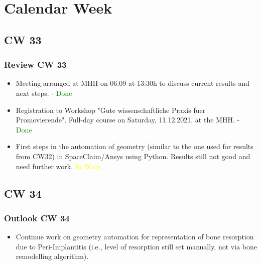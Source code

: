 \section{Calendar Week}
\subsection{CW 33}
\begin{frame}
  \frametitle{Review CW 33}
	\begin{itemize}
		\item Meeting arranged at MHH on 06.09 at 13:30h to discuss current results and next steps. - \textcolor{green}{Done}
		\item Registration to Workshop "Gute wissenschaftliche Praxis fuer Promovierende". Full-day course on Saturday, 11.12.2021, at the MHH. - \textcolor{green}{Done}
		\item First steps in the automation of geometry (similar to the one used for results from CW32) in SpaceClaim/Ansys using Python. Results still not good and need further work. \textcolor{yellow}{In Work}
	\end{itemize}
\end{frame}

\subsection{CW 34}
\begin{frame}
  \frametitle{Outlook CW 34}
	\begin{itemize}
		\item Continue work on geometry automation for representation of bone resorption due to Peri-Implantitis (i.e., level of resorption still set manually, not via bone remodelling algorithm).
	\end{itemize}
\end{frame}

